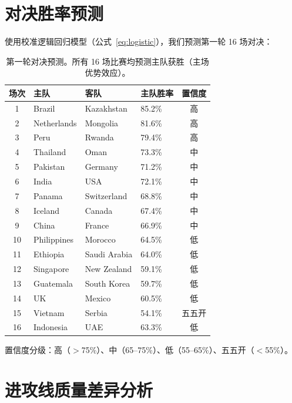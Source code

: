 \documentclass[11pt, a4paper]{article}
\begin{document}
\section{对决胜率预测}
\label{sec:matchups}

使用校准逻辑回归模型（公式~\ref{eq:logistic}），我们预测第一轮 16 场对决：

\begin{table}[H]
\centering
\caption{第一轮对决预测。所有 16 场比赛均预测主队获胜（主场优势效应）。}
\label{tab:matchups}
\begin{tabular}{clllc}
\toprule
\textbf{场次} & \textbf{主队} & \textbf{客队} & \textbf{主队胜率} & \textbf{置信度} \\
\midrule
1  & Brazil      & Kazakhstan    & 85.2\% & 高 \\
2  & Netherlands & Mongolia      & 81.6\% & 高 \\
3  & Peru        & Rwanda        & 79.4\% & 高 \\
4  & Thailand    & Oman          & 73.3\% & 中 \\
5  & Pakistan    & Germany       & 71.2\% & 中 \\
6  & India       & USA           & 72.1\% & 中 \\
7  & Panama      & Switzerland   & 68.8\% & 中 \\
8  & Iceland     & Canada        & 67.4\% & 中 \\
9  & China       & France        & 66.9\% & 中 \\
10 & Philippines & Morocco       & 64.5\% & 低 \\
11 & Ethiopia    & Saudi Arabia  & 64.0\% & 低 \\
12 & Singapore   & New Zealand   & 59.1\% & 低 \\
13 & Guatemala   & South Korea   & 59.7\% & 低 \\
14 & UK          & Mexico        & 60.5\% & 低 \\
15 & Vietnam     & Serbia        & 54.1\% & 五五开 \\
16 & Indonesia   & UAE           & 63.3\% & 低 \\
\bottomrule
\end{tabular}
\end{table}

\noindent 置信度分级：高（$>$75\%）、中（65--75\%）、低（55--65\%）、五五开（$<$55\%）。

\section{进攻线质量差异分析}
\label{sec:disparity}
\end{document}
